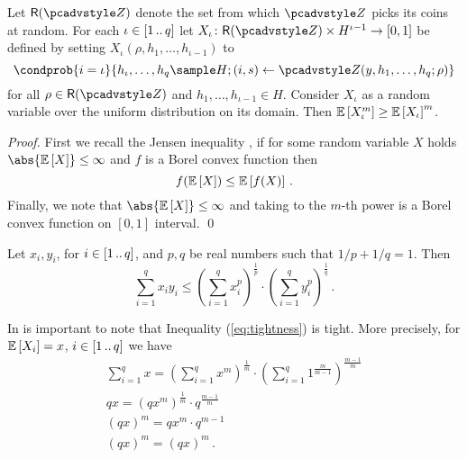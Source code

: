 \begin{lemma}\label{lem:jensen}
	Let $\RND{\zdv}$ denote the set from which $\zdv$ picks its coins at random.
	For each $\iota \in [1 \, .. \, q]$ let $X_\iota \colon \RND{\zdv} \times
	H^{\iota - 1} \to [0, 1]$ be defined by setting $X_\iota(\rho, h_1, \ldots,
h_{\iota - 1})$ to 
\[
  \condprob{i = \iota}{h_\iota, \ldots, h_q \sample H; (i, s) \gets \zdv(y, h_1,
    \ldots, h_q; \rho)}
	\] 
	for all $\rho \in \RND{\zdv}$ and $h_1, \ldots, h_{\iota - 1} \in H$. Consider
  $X_\iota$ as a random variable over the uniform distribution on its domain.
  Then $\mathbb{E}\left[X_\iota^m\right] \geq \mathbb{E}\left[X_\iota\right]^m$.
\end{lemma}
\begin{proof}
	First we recall the Jensen inequality \cite{W:Weissten20}, if for some random
  variable $X$ holds $\abs{\expected{X}} \leq \infty$ and $f$ is a Borel convex
  function then
	\[
		f(\mathbb{E}\left[X\right]) \leq \mathbb{E}\left[f(X)\right]\,.
	\] 
	Finally, we note that $\abs{\expected{X}} \leq \infty$ and taking to the
  $m$-th power is a Borel convex function on $[0, 1]$ interval. \qed
\end{proof}

\begin{lemma}\label{lem:holder}
	Let $x_i, y_i$, for $i \in [1 \, .. \, q]$, and $p, q$ be real numbers such that
  $1/p + 1/q = 1$. Then
	\begin{equation}
    \label{eq:tightness}
		\sum_{i = 1}^{q} x_i y_i \leq \left(\sum_{i = 1}^{q}
      x_i^p\right)^{\frac{1}{p}} \cdot \left(\sum_{i = 1}^{q}
      y_i^p\right)^{\frac{1}{q}}\,.
	\end{equation}
\end{lemma}

\begin{remark}
	In is important to note that Inequality (\ref{eq:tightness}) is tight. More
  precisely, for $\mathbb{E}\left[X_i\right] = x$, $i \in [1 \, .. \, q]$ we have
	\begin{gather*}
		\sum_{i = 1}^q x = \left(\sum_{i = 1}^{q} x^m\right)^\frac{1}{m} \cdot \left(\sum_{i = 1}^{q} 1^{\frac{m}{m - 1}}\right)^{\frac{m - 1}{m}} \\
		qx = \left(qx^m\right)^\frac{1}{m} \cdot q^{\frac{m - 1}{m}} \\
		(qx)^m = qx^m \cdot q^{m - 1} \\
		(qx)^m = (qx)^m\,.
	\end{gather*}
\end{remark}

